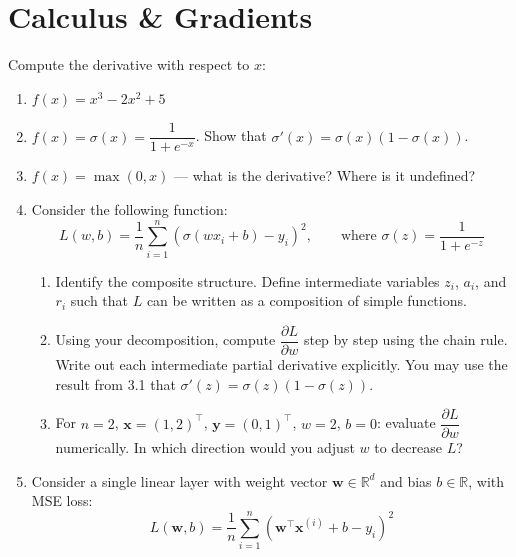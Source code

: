 \documentclass[12pt, a4paper]{scrartcl}
\begin{document}
\section{Calculus \& Gradients}

Compute the derivative with respect to $x$:

\begin{enumerate}

    \item $f(x) = x^3 - 2x^2 + 5$

    \item $f(x) = \sigma(x) = \dfrac{1}{1 + e^{-x}}$. Show that $\sigma'(x)
    = \sigma(x)(1 - \sigma(x))$.

    \item $f(x) = \max(0, x)$ --- what is the derivative? Where is it undefined?

\item Consider the following function:
\[
L(w, b) = \frac{1}{n}\sum_{i=1}^{n}\left(\sigma(wx_i + b) - y_i\right)^2,
\qquad \text{where } \sigma(z) = \frac{1}{1+e^{-z}}
\]

\begin{enumerate}

    \item Identify the composite structure. Define intermediate variables $z_i$,
    $a_i$, and $r_i$ such that $L$ can be written as a composition of simple
    functions.

    \item Using your decomposition, compute $\dfrac{\partial L}{\partial w}$
    step by step using the chain rule. Write out each intermediate partial
    derivative explicitly. You may use the result from 3.1 that $\sigma'(z) =
    \sigma(z)(1-\sigma(z))$.

    \item For $n=2$, $\mathbf{x} = (1, 2)^\top$, $\mathbf{y} = (0, 1)^\top$,
    $w = 2$, $b = 0$: evaluate $\dfrac{\partial L}{\partial w}$ numerically.
    In which direction would you adjust $w$ to decrease $L$?

\end{enumerate}

\item Consider a single linear layer with weight vector $\mathbf{w} \in \mathbb{R}^d$
and bias $b \in \mathbb{R}$, with MSE loss:
\[
L(\mathbf{w}, b) = \frac{1}{n}\sum_{i=1}^{n}
\left(\mathbf{w}^\top \mathbf{x}^{(i)} + b - y_i\right)^2
\]


\end{enumerate}
\end{document}
